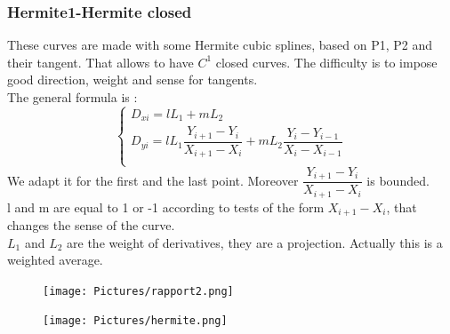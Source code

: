 \documentclass{article}
\begin{document}
\subsubsection*{Hermite1-Hermite closed}
These curves are made with some Hermite cubic splines, based on P1, P2 and their tangent. That allows to have $C^1$ closed curves. The difficulty is to impose good direction, weight and sense for tangents.\\ 
The general formula is :
\begin{equation}
  \left\{
  \begin{aligned}
    D_{xi} = l L_1 + m L_2\\
    D_{yi} = l L_1 \dfrac{Y_{i+1} - Y_{i}}{X_{i+1} - X_{i}} + m L_2 \dfrac{Y_{i} - Y_{i-1}}{X_{i} - X_{i-1}}\\
  \end{aligned}
  \right.
\end{equation}
We adapt it for the first and the last point. Moreover $\dfrac{Y_{i+1} - Y_{i}}{X_{i+1} - X_{i}}$ is bounded.\\
l and m are equal to 1 or -1 according to tests of the form $X_{i+1} - X_{i}$, that changes the sense of the curve.\\
$L_1$ and $L_2$ are the weight of derivatives, they are a projection. Actually this is a weighted average. \\
\begin{figure}[H]
   \texttt{[image: Pictures/rapport2.png]}
\end{figure}

\begin{figure}[H]
   \texttt{[image: Pictures/hermite.png]}
\end{figure}
\end{document}
